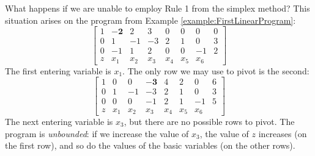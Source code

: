 \begin{example}
What happens if we are unable to employ Rule 1 from the simplex method?  This situation arises on the program from Example \ref{example:FirstLinearProgram}:
\begin{equation*}
\begin{bmatrix}
1 & \boldsymbol{-2} & 2  & 3  & 0 & 0 & 0 & 0\\
0 & 1  & -1 & -3 & 2 & 1 & 0  & 3 \\
0 & -1 &  1 & 2  & 0 & 0 & -1 & 2 \\ \hline
z & x_1 & x_2 & x_3 & x_4 & x_5 & x_6
\end{bmatrix}
\end{equation*}
The first entering variable is $x_1$.  The only row we may use to pivot is the second:
\begin{equation*}
\begin{bmatrix}
1 & 0  & 0  & \boldsymbol{-3} & 4 & 2 & 0 & 6\\
0 & 1  & -1 & -3 & 2 & 1 & 0  & 3 \\
0 & 0  & 0  & -1 & 2 & 1 & -1 & 5 \\ \hline
z & x_1 & x_2 & x_3 & x_4 & x_5 & x_6
\end{bmatrix}
\end{equation*}
The next entering variable is $x_3$, but there are no possible rows to pivot.  The program is \emph{unbounded}: if we increase the value of $x_3$, the value of $z$ increases (on the first row), and so do the values of the basic variables (on the other rows).
\end{example}
